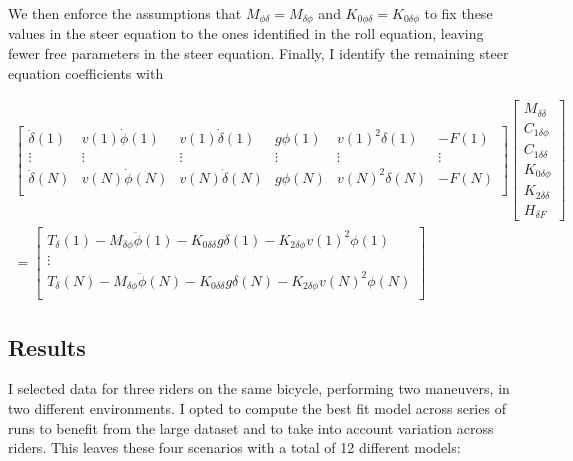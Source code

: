 \documentclass[a4paper]{article}
\begin{document}
We then enforce the assumptions that $M_{\phi\delta} = M_{\delta\phi}$ and
$K_{0\phi\delta} = K_{0\delta\phi}$ to fix these values in the steer equation
to the ones identified in the roll equation, leaving fewer free parameters in
the steer equation. Finally, I identify the remaining steer equation
coefficients with

\begin{align}
  \begin{bmatrix}
    \ddot{\delta}(1) &
    v(1) \dot{\phi}(1) &
    v(1) \dot{\delta}(1) &
    g \phi(1) &
    v(1)^2 \delta(1) &
    - F(1)\\
    \vdots & \vdots & \vdots & \vdots & \vdots & \vdots \\
    \ddot{\delta}(N) &
    v(N) \dot{\phi}(N) &
    v(N) \dot{\delta}(N) &
    g \phi(N) &
    v(N)^2 \delta(N) &
    - F(N)\\
  \end{bmatrix}
  \begin{bmatrix}
    M_{\delta\delta} \\
    C_{1\delta\phi} \\
    C_{1\delta\delta} \\
    K_{0\delta\phi} \\
    K_{2\delta\delta} \\
    H_{\delta F}
  \end{bmatrix} \nonumber \\
  =
  \begin{bmatrix}
    T_\delta(1)
    - M_{\delta\phi} \ddot{\phi}(1)
    - K_{0\delta\delta} g \delta(1)
    - K_{2\delta\phi} v(1)^2 \phi(1) \\
    \vdots\\
    T_\delta(N)
    - M_{\delta\phi} \ddot{\phi}(N)
    - K_{0\delta\delta} g \delta(N)
    - K_{2\delta\phi} v(N)^2 \phi(N) \\
  \end{bmatrix}
\end{align}

\subsection{Results}

I selected data for three riders on the same bicycle, performing two
maneuvers, in two different environments. I opted to compute the best fit model across series
of runs to benefit from the large dataset and to take into account variation across riders. 
This leaves these four scenarios with a total of 12 different models:
\end{document}
